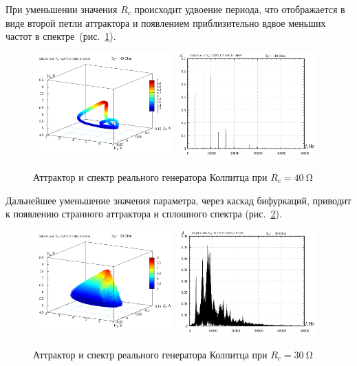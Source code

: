 При уменьшении значения $R_c$
происходит удвоение периода,
что отображается в виде второй петли аттрактора
и появлением приблизительно вдвое меньших частот в спектре~(рис.~\ref{atu:f:colp_r_attr_f_40}).

\begin{figure}[htb!]
  \centerline{
    \includegraphics[width=0.48\textwidth]{p/r/v1iv2_040000.png}
    \hfill
    \includegraphics[width=0.48\textwidth]{p/r/f_040000.png}
  }
  \caption{Аттрактор и спектр реального генератора Колпитца при $R_c = \SI{40}{\ohm} $}
  \label{atu:f:colp_r_attr_f_40}
\end{figure}

Дальнейшее уменьшение значения параметра,
через каскад бифуркаций, приводит
к появлению странного аттрактора и сплошного спектра
(рис.~\ref{atu:f:colp_r_attr_f_30}).

\begin{figure}[htb!]
  \centerline{
    \includegraphics[width=0.48\textwidth]{p/r/v1iv2_030000.png}
    \hfill
    \includegraphics[width=0.48\textwidth]{p/r/f_030000.png}
  }
  \caption{Аттрактор и спектр реального генератора Колпитца при $R_c = \SI{30}{\ohm} $}
  \label{atu:f:colp_r_attr_f_30}
\end{figure}

